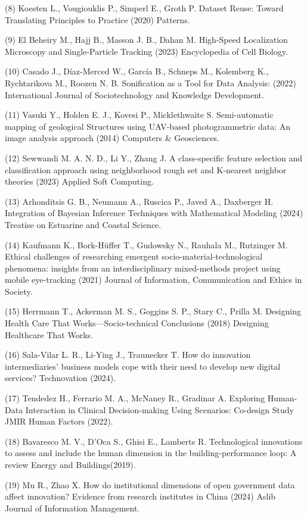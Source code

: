 \documentclass[
	12pt,				%
	oneside,			%
	a4paper,			%
	english,			%
	brazil				%
	]{abntex2ppgsi}
\begin{document}
\begin{apendicesenv}
(8) Koesten L., Vougiouklis P., Simperl E., Groth P. Dataset Reuse: Toward Translating Principles to Practice (2020) Patterns.

(9) El Beheiry M., Hajj B., Masson J. B., Dahan M. High-Speed Localization Microscopy and Single-Particle Tracking (2023) Encyclopedia of Cell Biology.

(10) Casado J., Díaz-Merced W., García B., Schneps M., Kolemberg K., Rychtarikova M., Roozen N. B. Sonification as a Tool for Data Analysis: (2022) International Journal of Sociotechnology and Knowledge Development.

(11) Vasuki Y., Holden E. J., Kovesi P., Micklethwaite S. Semi-automatic mapping of geological Structures using UAV-based photogrammetric data: An image analysis approach (2014) Computers \& Geosciences.

(12) Sewwandi M. A. N. D., Li Y., Zhang J. A class-specific feature selection and classification approach using neighborhood rough set and K-nearest neighbor theories (2023) Applied Soft Computing.

(13) Arhonditsis G. B., Neumann A., Ruscica P., Javed A., Daxberger H. Integration of Bayesian Inference Techniques with Mathematical Modeling (2024) Treatise on Estuarine and Coastal Science.

(14) Kaufmann K., Bork-Hüffer T., Gudowsky N., Rauhala M., Rutzinger M. Ethical challenges of researching emergent socio-material-technological phenomena: insights from an interdisciplinary mixed-methods project using mobile eye-tracking (2021) Journal of Information, Communication and Ethics in Society.

(15) Herrmann T., Ackerman M. S., Goggins S. P., Stary C., Prilla M. Designing Health Care That Works—Socio-technical Conclusions (2018) Designing Healthcare That Works.

(16) Sala-Vilar L. R., Li-Ying J., Traunecker T. How do innovation intermediaries’ business models cope with their need to develop new digital services? Technovation (2024).

(17) Tendedez H., Ferrario M. A., McNaney R., Gradinar A. Exploring Human-Data Interaction in Clinical Decision-making Using Scenarios: Co-design Study  JMIR Human Factors (2022).

(18) Bavaresco M. V., D'Oca S., Ghisi E., Lamberts R. 
Technological innovations to assess and include the human dimension in the building-performance loop: A review Energy and Buildings(2019).

(19) Mu R., Zhao X. How do institutional dimensions of open government data affect innovation? Evidence from research institutes in China (2024) Aslib Journal of Information Management.


\end{apendicesenv}
\end{document}
